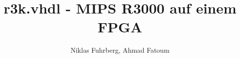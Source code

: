 







\usepackage[utf8]{inputenc}

\usepackage[T1]{fontenc}


\usepackage[ngerman]{babel}




\setcounter{tocdepth}{1}

\title[r3k.vhdl]{r3k.vhdl - MIPS R3000 auf einem FPGA}
\author{Niklas Fuhrberg, Ahmad Fatoum}
